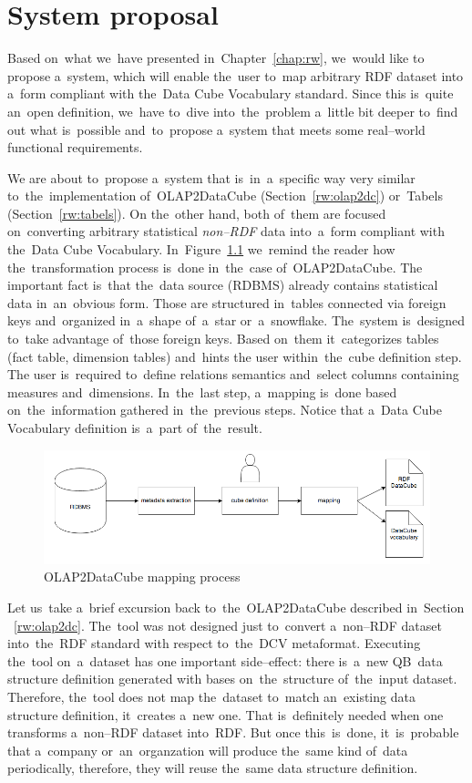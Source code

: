 \chapter{System proposal}
\label{ch:proposal}
Based on~what we~have presented in~Chapter~\ref{chap:rw}, we~would like to
propose a~system, which will enable the~user to~map arbitrary RDF dataset
into a~form compliant with the~Data Cube Vocabulary standard. Since this is~quite an~open definition, we~have to~dive into~the~problem a~little bit deeper to~find out what is~possible and~to~propose a~system that meets some real--world 
functional requirements.

We are about to~propose a~system that is~in~a~specific way very similar to~the~implementation of~OLAP2DataCube (Section~\ref{rw:olap2dc}) or~Tabels (Section~\ref{rw:tabels}).
On the~other hand, both of~them are 
focused on~converting arbitrary statistical \emph{non--RDF} data into~a~form 
compliant with the~Data Cube Vocabulary. In~Figure~\ref{fig:olap2dc-mapping} we~remind
the reader how the~transformation process is~done in~the~case of~OLAP2DataCube.
The important fact is~that the~data source (RDBMS) already contains statistical data in~an~obvious form. 
Those are structured in~tables connected via foreign keys and~organized in~a~shape of~a~star or~a~snowflake. The~system is~designed to~take advantage of~those 
foreign keys. Based on~them it~categorizes tables (fact table, dimension tables) and~hints
the user within~the~cube definition step.
The user is~required to~define relations semantics and~select columns 
containing measures and~dimensions. In~the~last step, a~mapping is~done based on~the~information gathered in~the~previous steps.
Notice that a~Data Cube Vocabulary definition is~a~part of~the~result.


\begin{figure}
	\centering
	\includegraphics[width=140mm]{img/mapping-olap2dc.png}
	\caption{OLAP2DataCube mapping process}
	\label{fig:olap2dc-mapping}
\end{figure}


Let us~take a~brief excursion back to~the~OLAP2DataCube described in~Section 
~\ref{rw:olap2dc}. The~tool was not designed just to~convert a~non--RDF dataset 
into~the~RDF standard with respect to~the~DCV metaformat. Executing the~tool on~a~dataset has one important side--effect: there is~a~new QB~data structure definition
generated with bases on~the~structure of~the~input dataset. Therefore, the~tool does not map the~dataset to~match an~existing data structure definition, it~creates a~new one. That is~definitely
needed when one transforms a~non--RDF dataset into~RDF. But once 
this~is~done, it~is~probable that a~company or~an~organzation will produce the~same kind of~data periodically, therefore, they will reuse the~same data structure definition.

